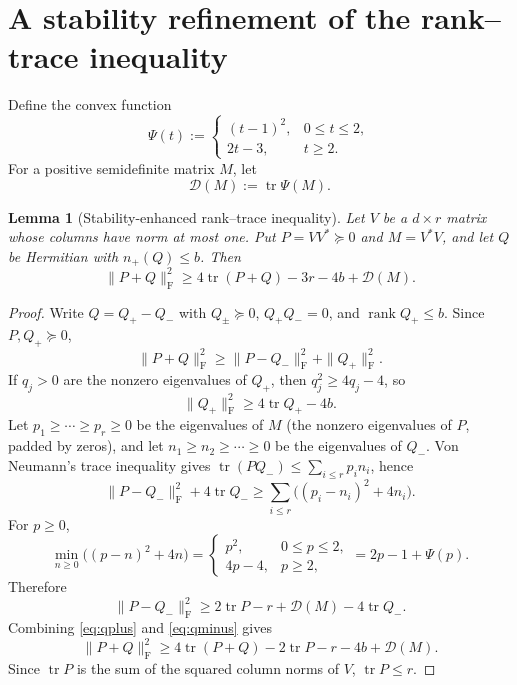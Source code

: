 \documentclass[11pt]{article}
\newtheorem{lemma}[theorem]{Lemma}
\DeclareMathOperator{\tr}{tr}
\newcommand{\F}{\mathrm F}
\newcommand{\cD}{\mathcal D}
\begin{document}
\section{A stability refinement of the rank--trace inequality}

Define the convex function
\begin{equation}\label{eq:Psi}
 \Psi(t):=
 \begin{cases}
  (t-1)^2,&0\le t\le2,\\
  2t-3,&t\ge2.
 \end{cases}
\end{equation}
For a positive semidefinite matrix $M$, let
\[
 \cD(M):=\tr\Psi(M).
\]

\begin{lemma}[Stability-enhanced rank--trace inequality]\label{lem:stable-rank-trace}
Let $V$ be a $d\times r$ matrix whose columns have norm at most one.  Put
$P=VV^*\succeq0$ and $M=V^*V$, and let $Q$ be Hermitian with $n_+(Q)\le b$.
Then
\begin{equation}\label{eq:stable-rank-trace}
 \|P+Q\|_{\F}^2
 \ge 4\tr(P+Q)-3r-4b+\cD(M).
\end{equation}
\end{lemma}

\begin{proof}
Write $Q=Q_+-Q_-$ with $Q_\pm\succeq0$, $Q_+Q_-=0$, and
$\operatorname{rank}Q_+\le b$.  Since $P,Q_+\succeq0$,
\[
 \|P+Q\|_{\F}^2
 \ge \|P-Q_-\|_{\F}^2+\|Q_+\|_{\F}^2.
\]
If $q_j>0$ are the nonzero eigenvalues of $Q_+$, then
$q_j^2\ge4q_j-4$, so
\begin{equation}\label{eq:qplus}
 \|Q_+\|_{\F}^2\ge4\tr Q_+-4b.
\end{equation}
Let $p_1\ge\cdots\ge p_r\ge0$ be the eigenvalues of $M$ (the nonzero
eigenvalues of $P$, padded by zeros), and let $n_1\ge n_2\ge\cdots\ge0$
be the eigenvalues of $Q_-$.  Von Neumann's trace inequality gives
$\tr(PQ_-)\le\sum_{i\le r}p_in_i$, hence
\[
 \|P-Q_-\|_{\F}^2+4\tr Q_-
 \ge \sum_{i\le r}\bigl((p_i-n_i)^2+4n_i\bigr).
\]
For $p\ge0$,
\[
 \min_{n\ge0}\bigl((p-n)^2+4n\bigr)
 =\begin{cases}p^2,&0\le p\le2,\\4p-4,&p\ge2,\end{cases}
 =2p-1+\Psi(p).
\]
Therefore
\begin{equation}\label{eq:qminus}
 \|P-Q_-\|_{\F}^2
 \ge2\tr P-r+\cD(M)-4\tr Q_-.
\end{equation}
Combining \eqref{eq:qplus} and \eqref{eq:qminus} gives
\[
 \|P+Q\|_{\F}^2
 \ge4\tr(P+Q)-2\tr P-r-4b+\cD(M).
\]
Since $\tr P$ is the sum of the squared column norms of $V$, $\tr P\le r$.
\end{proof}
\end{document}
